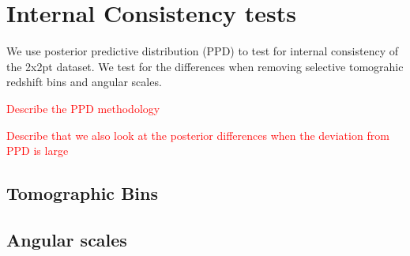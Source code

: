 \documentclass[fleqn,usenatbib]{mnras}
\newcommand{\red}[1]{\textcolor{red}{#1}}
\begin{document}









\appendix

\section{Internal Consistency tests}

We use posterior predictive distribution (PPD) to test for internal consistency of the 2x2pt dataset. We test for the differences when removing selective tomograhic redshift bins and angular scales.

\red{Describe the PPD methodology}

\red{Describe that we also look at the posterior differences when the deviation from PPD is large}

\subsection{Tomographic Bins}

\subsection{Angular scales}


\end{document}
